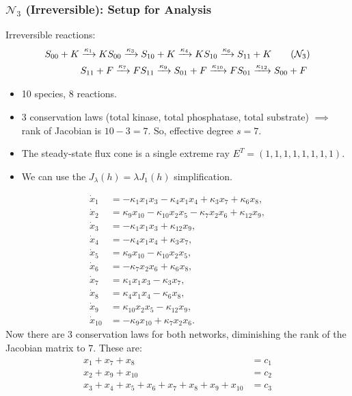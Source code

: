 \documentclass[aspectratio=169]{beamer}
\begin{document}
\begin{frame}{\insertsectionhead}
	\frametitle{$\mathcal{N}_3$ (Irreversible): Setup for Analysis}
	Irreversible reactions:
	\begin{align*}
		S_{00} + K \xrightarrow{\kappa_1} KS_{00} \xrightarrow{\kappa_3} S_{10} + K \xrightarrow{\kappa_4} KS_{10} \xrightarrow{\kappa_6} S_{11} + K \tag{$\mathcal{N}_3$}
		\\
		S_{11} + F \xrightarrow{\kappa_7} FS_{11} \xrightarrow{\kappa_9} S_{01} + F \xrightarrow{\kappa_{10}} FS_{01} \xrightarrow{\kappa_{12}} S_{00} + F \ \notag
	\end{align*}
	\begin{itemize}
		\item 10 species, 8 reactions.
		\item 3 conservation laws (total kinase, total phosphatase, total substrate) $\implies$ rank of Jacobian is $10-3=7$. So, effective degree $s=7$.
		\item The steady-state flux cone is a \alert{single extreme ray} $E^T = (1,1,1,1,1,1,1,1)$.
		\item We can use the $J_\lambda(h) = \lambda J_1(h)$ simplification.
	\end{itemize}
\end{frame}

\begin{frame}
	\[
		\begin{aligned}
			\dot{x}_{1} &= -\kappa_{1} x_{1} x_{3} - \kappa_{4} x_{1} x_{4} + \kappa_{3} x_{7} + \kappa_{6} x_{8},\\
			\dot{x}_{2} &= \kappa_{9} x_{10} - \kappa_{10} x_{2} x_{5} - \kappa_{7} x_{2} x_{6} + \kappa_{12} x_{9},\\
			\dot{x}_{3} &= -\kappa_{1} x_{1} x_{3} + \kappa_{12} x_{9},\\
			\dot{x}_{4} &= -\kappa_{4} x_{1} x_{4} + \kappa_{3} x_{7},\\
			\dot{x}_{5} &= \kappa_{9} x_{10} - \kappa_{10} x_{2} x_{5},\\
			\dot{x}_{6} &= -\kappa_{7} x_{2} x_{6} + \kappa_{6} x_{8},\\
			\dot{x}_{7} &= \kappa_{1} x_{1} x_{3} - \kappa_{3} x_{7},\\
			\dot{x}_{8} &= \kappa_{4} x_{1} x_{4} - \kappa_{6} x_{8},\\
			\dot{x}_{9} &= \kappa_{10} x_{2} x_{5} - \kappa_{12} x_{9},\\
			\dot{x}_{10} &= -\kappa_{9} x_{10} + \kappa_{7} x_{2} x_{6}.
		\end{aligned}
	\]
	Now there are 3 conservation laws for both networks, diminishing the rank of the Jacobian matrix to $7$. These are:
	\[
		\begin{aligned}
			x_{1}+x_{7}+x_{8}&=c_{1}\\x_{2}+x_{9}+x_{10}&=c_{2}\\x_{3}+x_{4}+x_{5}+x_{6}+x_{7}+x_{8}+x_{9}+x_{10}&=c_{3}
		\end{aligned}
	\]
\end{frame}
\end{document}
